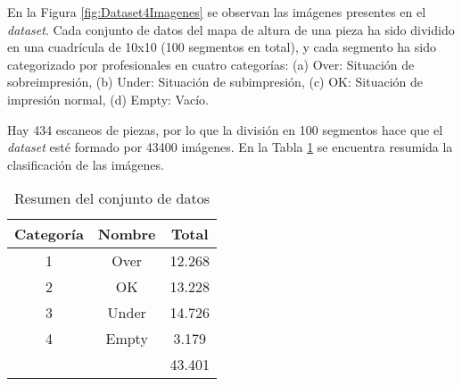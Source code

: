 \documentclass{report}
\begin{document}
En la Figura \ref{fig:Dataset4Imagenes} se observan las imágenes presentes en el \textit{dataset}. Cada conjunto de datos del mapa de altura de una pieza ha sido dividido en una cuadrícula de 10x10 (100 segmentos en total), y cada segmento ha sido categorizado por profesionales en cuatro categorías: (a) Over: Situación de sobreimpresión, (b) Under: Situación de subimpresión, (c) OK: Situación de impresión normal, (d) Empty: Vacío.

Hay 434 escaneos de piezas, por lo que la división en 100 segmentos hace que el \textit{dataset} esté formado por 43400 imágenes. En la Tabla \ref{tab:Dataset} se encuentra resumida la clasificación de las imágenes.


\begin{table}[H]
\centering
\begin{tabular}{|c|c|c|}
\hline
\rowcolor[HTML]{FFFFFF} 
{\color[HTML]{000000} Categoría} & Nombre & Total  \\ \hline
1                                & Over   & 12.268 \\ \hline
2                                & OK     & 13.228 \\ \hline
3                                & Under  & 14.726 \\ \hline
4                                & Empty  & 3.179  \\ \hline
                                 &        & 43.401 \\ \hline
\end{tabular}
\caption{Resumen del conjunto de datos}
\label{tab:Dataset}
\end{table}
\end{document}
